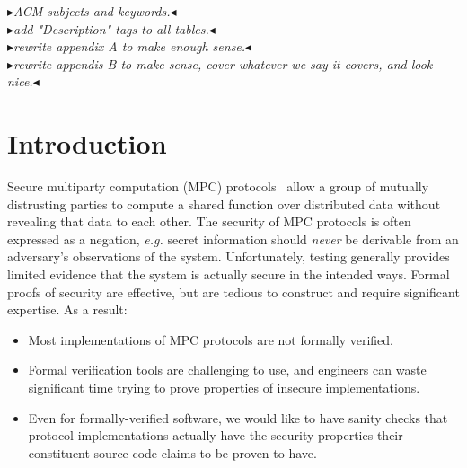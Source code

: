 \documentclass[acmlarge, manuscript, screen, review, anonymous, table]{acmart}
\newcommand{\eg}{\textit{e.g.}\xspace}
\newcommand{\mynote}[2]
    {{\color{red} \fbox{\bfseries\sffamily\scriptsize#1}
    {\small$\blacktriangleright$\textsf{\emph{#2}}$\blacktriangleleft$}}~}
\newcommand{\todo}[1]{\mynote{TODO}{#1}}
\begin{document}



\maketitle

\todo{ACM subjects and keywords.}\\
\todo{add "Description" tags to all tables.}\\
\todo{rewrite appendix A to make enough sense.}\\
\todo{rewrite appendis B to make sense, cover whatever we say it covers, and look nice.}\\



\section{Introduction}

Secure multiparty computation (MPC) protocols~\cite{evans2018pragmatic} allow a group of mutually distrusting parties to compute a shared function over distributed data without revealing that data to each other.
The security of MPC protocols is often expressed as a negation,
\eg secret information should \emph{never} be derivable from an adversary's observations of the system.
Unfortunately, testing generally provides limited evidence that the system is actually secure in the intended ways.
Formal proofs of security are effective, but are tedious to construct and require significant expertise.
As a result:
%
\begin{itemize}
\item Most implementations of MPC protocols are not formally verified.
\item Formal verification tools are challenging to use, and engineers can waste significant time trying to prove properties of insecure implementations.
\item Even for formally-verified software, we would like to have sanity checks
  that protocol implementations actually have the security properties their constituent source-code claims to be proven to have.
\end{itemize}
\end{document}

